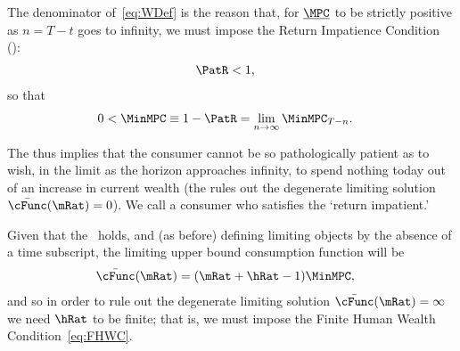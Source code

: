 \documentclass[BufferStockTheory]{subfiles}
\begin{document}
The denominator of~\eqref{eq:WDef} is the reason that, for $\underbar{\MPC}$ to be strictly positive as $n=T-t$ goes to infinity, we must impose the Return Impatience Condition (\RIC):
\begin{align}
  \PatR  & < 1   \label{eq:RIC},
\end{align}
so that
\begin{align}
  0 <  \MinMPC  & \equiv   1-\PatR = \lim_{n \rightarrow \infty} \MinMPC_{T-n} \label{eq:MinMPCDef}
                  .
\end{align}

The {\RIC} thus implies that the consumer cannot be so pathologically patient as to wish, in the limit as the horizon approaches infinity, to spend nothing today out of an increase in current wealth (the {\RIC} rules out the degenerate limiting solution $\bar{\cFunc}(\mRat)=0$).  We call a consumer who satisfies the {\RIC} `return impatient.'

Given that the {\RIC}~holds, and (as before) defining limiting objects by the absence of a time subscript, the limiting upper bound consumption function will be
\begin{align}\label{eq:cFuncPFUnc}
  \bar{\cFunc}(\mRat)  & = (\mRat+\hRat-1)\MinMPC,
\end{align}
and so in order to rule out the degenerate limiting
solution $\bar{\cFunc}(\mRat) = \infty$ we need $\hRat$ to be finite; that is, we
must impose the Finite Human Wealth Condition~\eqref{eq:FHWC}.

\hypertarget{ValuePFAnalytical}{}
\hypertarget{Autarky-Value-PF}{}
\end{document}
